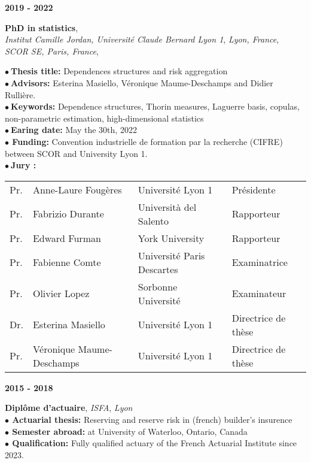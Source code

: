 \documentclass[a4paper,11pt]{article}
\newcommand{\tabcv}[2]{
\begin{minipage}[t]{0.12\linewidth}
\textbf{\footnotesize #1}
\end{minipage}\hfill
\begin{minipage}[t]{0.85\linewidth}
#2
\end{minipage}
\vspace{1em}
}
\begin{document}
\begin{flushleft}
\tabcv{2019 - 2022}{
\textbf{PhD in statistics},\\ \textit{Institut Camille Jordan, Université Claude Bernard Lyon 1}, \textit{Lyon, France}, \\ \textit{SCOR SE, Paris, France}, \textit{}\\[0.5em]
{\footnotesize \textbf{$\bullet\ $Thesis title:} {Dependences structures and risk aggregation}\\
\textbf{$\bullet\ $Advisors:} Esterina Masiello, Véronique Maume-Deschamps and Didier Rullière.\\
\textbf{$\bullet\ $Keywords:} {Dependence structures, Thorin measures, Laguerre basis, copulas, non-parametric estimation, high-dimensional statistics}\\
\textbf{$\bullet\ $Earing date:} May the 30th, 2022\\
\textbf{$\bullet$ Funding:} Convention industrielle de formation par la recherche (CIFRE) between SCOR and University Lyon 1.\\
\textbf{$\bullet\ $Jury :} \\[0.25em]
\begin{tabular}{llll}
{Pr.} & {Anne-Laure Fougères}       & {Université Lyon 1} & {Présidente} \\
{Pr.} & {Fabrizio Durante}          & {Università del Salento} & {Rapporteur} \\
{Pr.} & {Edward Furman}             & {York University} & {Rapporteur} \\
{Pr.} & {Fabienne Comte}            & {Université Paris Descartes} & {Examinatrice} \\
{Pr.} & {Olivier Lopez}             & {Sorbonne Université} & {Examinateur} \\
{Dr.} & {Esterina Masiello}         & {Université Lyon 1} & {Directrice de thèse} \\
{Pr.} & {Véronique Maume-Deschamps} & {Université Lyon 1} & {Directrice de thèse} \\
\end{tabular}}
}

\tabcv{2015 - 2018}{
\textbf{Diplôme d'actuaire}, \textit{ISFA}, \textit{Lyon}\\[0.5em]
{\footnotesize \textbf{$\bullet$ Actuarial thesis:} Reserving and reserve risk in (french) builder's insurence\\
\footnotesize \textbf{$\bullet$ Semester abroad:} at University of Waterloo, Ontario, Canada\\
\footnotesize \textbf{$\bullet$ Qualification:} Fully qualified actuary of the French Actuarial Institute since 2023. 
}
}


\end{flushleft}
\end{document}
